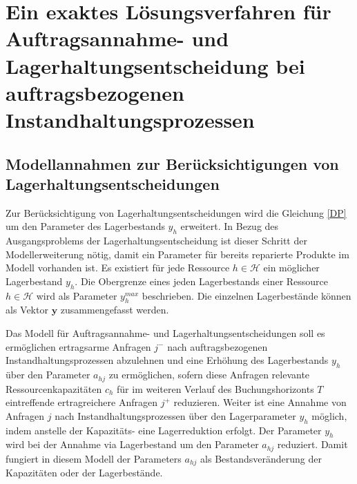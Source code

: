 \chapter{Ein exaktes Lösungsverfahren für Auftragsannahme- und Lagerhaltungsentscheidung bei auftragsbezogenen Instandhaltungsprozessen}\label{HauptteilDP}
\setcounter{footnote}{7}

\section{Modellannahmen zur Berücksichtigungen von Lagerhaltungsentscheidungen}


Zur Berücksichtigung von Lagerhaltungsentscheidungen wird die Gleichung \eqref{DP} um den Parameter des Lagerbestands $y_{h}$ erweitert. In Bezug des Ausgangsproblems der Lagerhaltungsentscheidung ist dieser Schritt der Modellerweiterung nötig, damit ein Parameter für bereits reparierte Produkte im Modell vorhanden ist. Es existiert für jede Ressource $h\in\mathcal{H}$ ein möglicher Lagerbestand $y_h$. Die Obergrenze eines jeden Lagerbestands einer Ressource $h\in\mathcal{H}$ wird als Parameter $y_{h}^{max}$ beschrieben. Die einzelnen Lagerbestände können als Vektor $\textbf{y}$ zusammengefasst werden. %


Das Modell für Auftragsannahme- und Lagerhaltungsentscheidungen soll es ermöglichen ertragsarme Anfragen $j^{-}$ nach auftragsbezogenen Instandhaltungsprozessen abzulehnen und eine Erhöhung des Lagerbestands $y_{h}$ über den Parameter $a_{hj}$ zu ermöglichen, sofern diese Anfragen relevante Ressourcenkapazitäten $c_{h}$ für im weiteren Verlauf des Buchungshorizonts $T$ eintreffende ertragreichere Anfragen $j^{+}$ reduzieren. Weiter ist eine Annahme von Anfragen $j$ nach Instandhaltungsprozessen über den Lagerparameter $y_{h}$ möglich, indem anstelle der Kapazitäts- eine Lagerreduktion erfolgt. Der Parameter $y_{h}$ wird bei der Annahme via Lagerbestand um den Parameter $a_{hj}$ reduziert. Damit fungiert in diesem Modell der Parameters $a_{hj}$ als Bestandsveränderung der Kapazitäten oder der Lagerbestände. 

